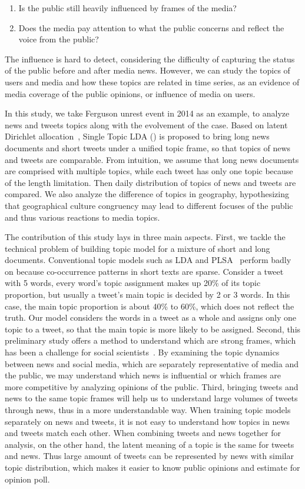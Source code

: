 \begin{enumerate}
\item Is the public still heavily influenced by frames of the media?
\item Does the media pay attention to what the public concerns and reflect the voice from the public?
\end{enumerate}

The influence is hard to detect, considering the difficulty of capturing the status of the public before and after media news. However, we can study the topics of users and media and how these topics are related in time series, as an evidence of media coverage of the public opinions, or influence of media on users.  

In this study, we take Ferguson unrest event in 2014 as an example, to analyze news and tweets topics along with the evolvement of the case. Based on latent Dirichlet allocation~\cite[LDA]{blei2003latent}, Single Topic LDA (\stlda) is proposed to bring long news documents and short tweets under a unified topic frame, so that topics of news and tweets are comparable. From intuition, we assume that long news documents are comprised with multiple topics, while each tweet has only one topic because of the length limitation. Then daily distribution of topics of news and tweets are compared. We also analyze the difference of topics in geography, hypothesizing that geographical culture congruency may lead to different focuses of the public and thus various reactions to media topics.

The contribution of this study lays in three main aspects. First, we tackle the technical problem of building topic model for a mixture of short and long documents. Conventional topic models such as LDA and PLSA~\cite{hofmann1999probabilistic} perform badly on because co-occurrence patterns in short texts are sparse. Consider a tweet with 5 words, every word's topic assignment makes up 20\% of its topic proportion, but usually a tweet's main topic is decided by 2 or 3 words. In this case, the main topic proportion is about 40\% to 60\%, which does not reflect the truth. Our model considers the words in a tweet as a whole and assigns only one topic to a tweet, so that the main topic is more likely to be assigned.
Second, this preliminary study offers a method to understand which are strong frames, which has been a challenge for social scientists~\cite{chong2007framing}. By examining the topic dynamics between news and social media, which are separately representative of media and the public, we may understand which news is influential or which frames are more competitive by analyzing opinions of the public.
Third, bringing tweets and news to the same topic frames will help us to understand large volumes of tweets through news, thus in a more understandable way. When training topic models separately on news and tweets, it is not easy to understand how topics in news and tweets match each other. When combining tweets and news together for analysis, on the other hand, the latent meaning of a topic is the same for tweets and news. Thus large amount of tweets can be represented by news with similar topic distribution, which makes it easier to know public opinions and estimate for opinion poll. 
